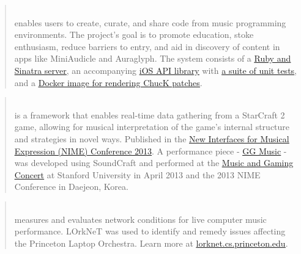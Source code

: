 

\begin{cvparagraph}


\begin{quote}
\\\leading{13pt} 
enables users to create, curate, and share code from music programming environments.
The project's goal is to promote education, stoke enthusiasm, reduce barriers to entry, and aid in discovery of content in apps like MiniAudicle and Auraglyph.
The system consists of a \href{https://github.com/markcerqueira/chuckpad-social}{\underline{Ruby and Sinatra server}},
an accompanying \href{https://github.com/markcerqueira/chuckpad-social-ios}{\underline{iOS API library}} with 
\href{https://github.com/markcerqueira/hello-chuckpad}{\underline{a suite of unit tests}},
and a \href{https://github.com/markcerqueira/chuck-renderer}{\underline{Docker image for rendering ChucK patches}}.
\end{quote}

\begin{quote}
\\\leading{13pt}
is a framework that enables real-time data gathering from a StarCraft 2 game, allowing for musical interpretation of the game’s internal structure and strategies in novel ways.
Published in the \href{http://www.nime.org/proceedings/2013/nime2013_146.pdf}{\underline{New Interfaces for Musical Expression (NIME) Conference 2013}}.
A performance piece - \href{https://github.com/markcerqueira/resume/raw/master/publications/gg-music.pdf}{\underline{GG Music}} - was developed using SoundCraft and performed at the \href{https://www.youtube.com/watch?v=WisMhY5BWa4}{\underline{Music and Gaming Concert}} at Stanford University in April 2013 and the 2013 NIME Conference in Daejeon, Korea.
\end{quote}

\begin{quote}
\\\leading{13pt}
measures and evaluates network conditions for live computer music performance.
LOrkNeT was used to identify and remedy issues affecting the Princeton Laptop Orchestra.
Learn more at \href{lorknet.cs.princeton.edu}{\underline{lorknet.cs.princeton.edu}}.
\end{quote}

\end{cvparagraph}
